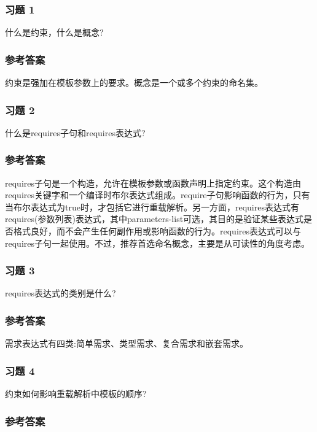 \subsubsection{习题 1}

什么是约束，什么是概念?

\subsubsection{参考答案}

约束是强加在模板参数上的要求。概念是一个或多个约束的命名集。


\subsubsection{习题 2}

什么是requires子句和requires表达式?

\subsubsection{参考答案}

requires子句是一个构造，允许在模板参数或函数声明上指定约束。这个构造由requires关键字和一个编译时布尔表达式组成。require子句影响函数的行为，只有当布尔表达式为true时，才包括它进行重载解析。另一方面，requires表达式有requires(参数列表)表达式，其中parameters-list可选，其目的是验证某些表达式是否格式良好，而不会产生任何副作用或影响函数的行为。requires表达式可以与requires子句一起使用。不过，推荐首选命名概念，主要是从可读性的角度考虑。

\subsubsection{习题 3}

requires表达式的类别是什么?

\subsubsection{参考答案}

需求表达式有四类:简单需求、类型需求、复合需求和嵌套需求。

\subsubsection{习题 4}

约束如何影响重载解析中模板的顺序?

\subsubsection{参考答案}

